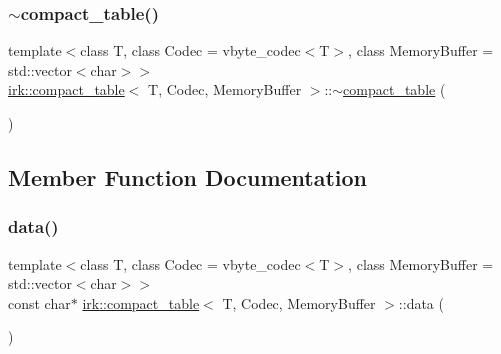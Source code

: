 \mbox{\label{classirk_1_1compact__table_afd085e91ac574633aaba9e3f606fbe59}} 
\subsubsection{\texorpdfstring{$\sim$compact\+\_\+table()}{~compact\_table()}}
{\footnotesize\ttfamily template$<$class T, class Codec = vbyte\+\_\+codec$<$\+T$>$, class Memory\+Buffer = std\+::vector$<$char$>$$>$ \\
\mbox{\hyperlink{classirk_1_1compact__table}{irk\+::compact\+\_\+table}}$<$ T, Codec, Memory\+Buffer $>$\+::$\sim$\mbox{\hyperlink{classirk_1_1compact__table}{compact\+\_\+table}} (\begin{DoxyParamCaption}{ }\end{DoxyParamCaption})\hspace{0.3cm}{\ttfamily [default]}}



\subsection{Member Function Documentation}
\mbox{\label{classirk_1_1compact__table_a6e52197052d12372b72d568ce9df384f}} 
\subsubsection{\texorpdfstring{data()}{data()}}
{\footnotesize\ttfamily template$<$class T, class Codec = vbyte\+\_\+codec$<$\+T$>$, class Memory\+Buffer = std\+::vector$<$char$>$$>$ \\
const char$\ast$ \mbox{\hyperlink{classirk_1_1compact__table}{irk\+::compact\+\_\+table}}$<$ T, Codec, Memory\+Buffer $>$\+::data (\begin{DoxyParamCaption}{ }\end{DoxyParamCaption})\hspace{0.3cm}{\ttfamily [inline]}}

\mbox{\label{classirk_1_1compact__table_a71a7a452bf75a037e9bf22e231124a5e}} 
